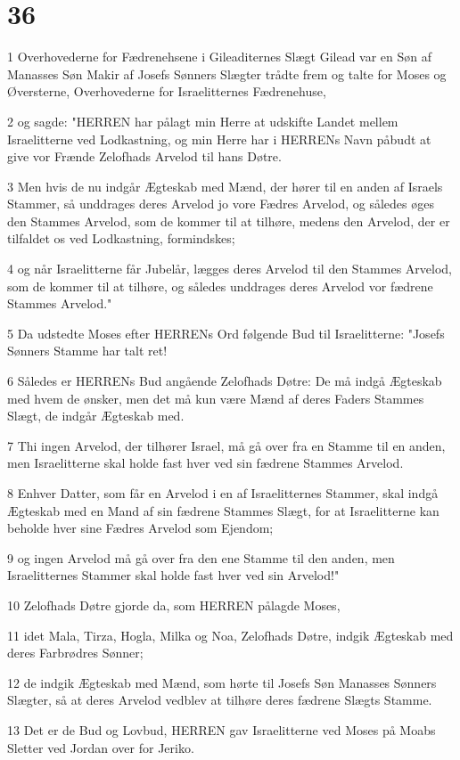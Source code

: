 \chapter{36}

\par 1 Overhovederne for Fædrenehsene i Gileaditernes Slægt Gilead var en Søn af Manasses Søn Makir af Josefs Sønners Slægter trådte frem og talte for Moses og Øversterne, Overhovederne for Israelitternes Fædrenehuse,
\par 2 og sagde: "HERREN har pålagt min Herre at udskifte Landet mellem Israelitterne ved Lodkastning, og min Herre har i HERRENs Navn påbudt at give vor Frænde Zelofhads Arvelod til hans Døtre.
\par 3 Men hvis de nu indgår Ægteskab med Mænd, der hører til en anden af Israels Stammer, så unddrages deres Arvelod jo vore Fædres Arvelod, og således øges den Stammes Arvelod, som de kommer til at tilhøre, medens den Arvelod, der er tilfaldet os ved Lodkastning, formindskes;
\par 4 og når Israelitterne får Jubelår, lægges deres Arvelod til den Stammes Arvelod, som de kommer til at tilhøre, og således unddrages deres Arvelod vor fædrene Stammes Arvelod."
\par 5 Da udstedte Moses efter HERRENs Ord følgende Bud til Israelitterne: "Josefs Sønners Stamme har talt ret!
\par 6 Således er HERRENs Bud angående Zelofhads Døtre: De må indgå Ægteskab med hvem de ønsker, men det må kun være Mænd af deres Faders Stammes Slægt, de indgår Ægteskab med.
\par 7 Thi ingen Arvelod, der tilhører Israel, må gå over fra en Stamme til en anden, men Israelitterne skal holde fast hver ved sin fædrene Stammes Arvelod.
\par 8 Enhver Datter, som får en Arvelod i en af Israelitternes Stammer, skal indgå Ægteskab med en Mand af sin fædrene Stammes Slægt, for at Israelitterne kan beholde hver sine Fædres Arvelod som Ejendom;
\par 9 og ingen Arvelod må gå over fra den ene Stamme til den anden, men Israelitternes Stammer skal holde fast hver ved sin Arvelod!"
\par 10 Zelofhads Døtre gjorde da, som HERREN pålagde Moses,
\par 11 idet Mala, Tirza, Hogla, Milka og Noa, Zelofhads Døtre, indgik Ægteskab med deres Farbrødres Sønner;
\par 12 de indgik Ægteskab med Mænd, som hørte til Josefs Søn Manasses Sønners Slægter, så at deres Arvelod vedblev at tilhøre deres fædrene Slægts Stamme.
\par 13 Det er de Bud og Lovbud, HERREN gav Israelitterne ved Moses på Moabs Sletter ved Jordan over for Jeriko.


